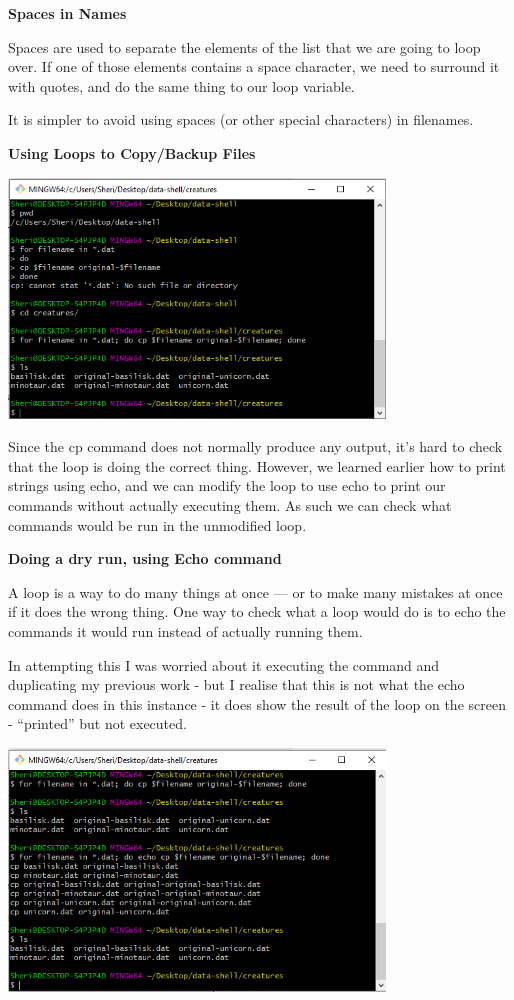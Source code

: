 \documentclass{article}
\begin{document}
\textbf{Spaces in Names}

Spaces are used to separate the elements of the list that we are going to loop over. If one of those elements contains a space character, we need to surround it with quotes, and do the same thing to our loop variable.

It is simpler to avoid using spaces (or other special characters) in filenames.

\textbf{Using Loops to Copy/Backup Files}

\includegraphics[width=10cm]{Images/GitBash_049.PNG}

Since the cp command does not normally produce any output, it’s hard to check that the loop is doing the correct thing. However, we learned earlier how to print strings using echo, and we can modify the loop to use echo to print our commands without actually executing them. As such we can check what commands would be run in the unmodified loop.

\textbf{Doing a dry run, using Echo command}

A loop is a way to do many things at once — or to make many mistakes at once if it does the wrong thing. One way to check what a loop would do is to echo the commands it would run instead of actually running them.

In attempting this I was worried about it executing the command and duplicating my previous work - but I realise that this is not what the echo command does in this instance - it does show the result of the loop on the screen - ``printed'' but not executed. 

\includegraphics[width=10cm]{Images/GitBash_050.PNG}
\end{document}
